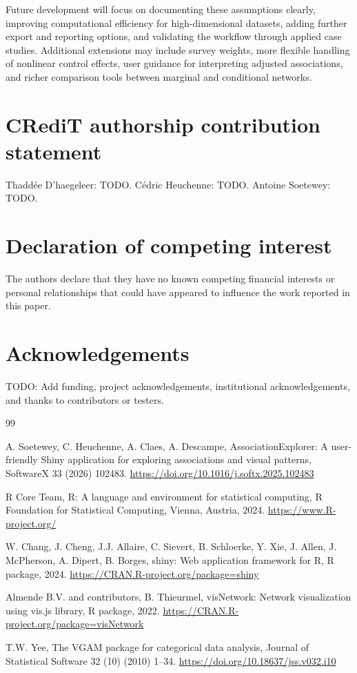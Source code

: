 \documentclass[11pt,a4paper]{article}
\begin{document}
Future development will focus on documenting these assumptions clearly, improving computational efficiency for high-dimensional datasets, adding further export and reporting options, and validating the workflow through applied case studies. Additional extensions may include survey weights, more flexible handling of nonlinear control effects, user guidance for interpreting adjusted associations, and richer comparison tools between marginal and conditional networks.

\section*{CRediT authorship contribution statement}

Thaddée D'haegeleer: TODO. Cédric Heuchenne: TODO. Antoine Soetewey: TODO.

\section*{Declaration of competing interest}

The authors declare that they have no known competing financial interests or personal relationships that could have appeared to influence the work reported in this paper.

\section*{Acknowledgements}

TODO: Add funding, project acknowledgements, institutional acknowledgements, and thanks to contributors or testers.

\begin{thebibliography}{99}

A. Soetewey, C. Heuchenne, A. Claes, A. Descampe,
AssociationExplorer: A user-friendly Shiny application for exploring associations and visual patterns,
SoftwareX 33 (2026) 102483.
\url{https://doi.org/10.1016/j.softx.2025.102483}

R Core Team,
R: A language and environment for statistical computing,
R Foundation for Statistical Computing, Vienna, Austria, 2024.
\url{https://www.R-project.org/}

W. Chang, J. Cheng, J.J. Allaire, C. Sievert, B. Schloerke, Y. Xie, J. Allen, J. McPherson, A. Dipert, B. Borges,
shiny: Web application framework for R,
R package, 2024.
\url{https://CRAN.R-project.org/package=shiny}

Almende B.V. and contributors, B. Thieurmel,
visNetwork: Network visualization using vis.js library,
R package, 2022.
\url{https://CRAN.R-project.org/package=visNetwork}

T.W. Yee,
The VGAM package for categorical data analysis,
Journal of Statistical Software 32 (10) (2010) 1--34.
\url{https://doi.org/10.18637/jss.v032.i10}

\end{thebibliography}
\end{document}

